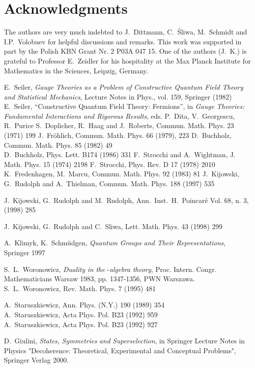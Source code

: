 \documentclass[a4paper,12pt]{article}
\begin{document}
\section*{Acknowledgments}

The authors are very much indebted to J.~Dittmann, C.~\'Sliwa,
M.~Schmidt and I.P.~Volo\-bu\-ev for helpful discussions and
remarks. This work was supported in part by the Polish KBN Grant
Nr. 2 P03A 047 15. One of the authors (J.~K.) is grateful to
Professor E.~Zeidler for his hospitality at the Max Planck
Institute for Mathematics in the Sciences, Leipzig, Germany.


\begin{thebibliography}{99}
E.~Seiler, {\em Gauge Theories as a Problem of Constructive
Quantum Field Theory and Statistical Mechanics}, Lecture Notes in
Phys., vol. 159, Springer (1982) \\ E.~Seiler, ``Constructive
Quantum Field Theory: Fermions'', in {\em Gauge Theories:
Fundamental Interactions and Rigorous Results}, eds. P.~Dita,
V.~Georgescu, R.~Purice
S.~Doplicher, R.~Haag and J.~Roberts, Commun. Math. Phys. 23
(1971) 199
J.~Fr\"ohlich, Commun. Math. Phys. 66 (1979), 223
D.~Buchholz, Commun. Math. Phys. 85 (1982) 49 \\ D.~Buchholz,
Phys. Lett. B174 (1986) 331
F.~Strocchi and A.~Wightman, J. Math. Phys. 15 (1974) 2198
F.~Strocchi, Phys. Rev. D 17 (1978) 2010
K.~Fredenhagen, M.~Marcu, Commun. Math. Phys. 92 (1983) 81
J.~Kijowski, G.~Rudolph and A.~Thielman, Commun. Math. Phys. 188
(1997) 535

J.~Kijowski, G.~Rudolph and M.~Rudolph, Ann.~Inst.~H.~Poincar\'e
Vol. 68, n. 3, (1998) 285

J.~Kijowski, G.~Rudolph and C.~Sliwa, Lett. Math. Phys. 43 (1998)
299

A.~Klimyk, K.~Schm\"udgen, {\em Quantum Groups and Their
Representations}, Springer 1997

S.~L.~Woronowicz, {\em Duality in the} \coordHE{}-{\em algebra
theory}, Proc. Intern. Congr. Mathematicians Warsaw 1983, pp.
1347-1356, PWN Warszawa.
\\
 S.~L.~Woronowicz, Rev. Math. Phys. 7 (1995) 481

 A.~Staruszkiewicz, Ann. Phys. (N.Y.) 190 (1989) 354
\\
A.~Staruszkiewicz, Acta Phys. Pol. B23 (1992) 959
\\
A.~Staruszkiewicz, Acta Phys. Pol. B23 (1992) 927



 D.~Giulini, {\em States, Symmetries and
Superselection}, in Springer Lecture Notes in Physics
"Decoherence: Theoretical, Experimental and Conceptual Problems",
Springer Verlag 2000.



\end{thebibliography}
\end{document}
